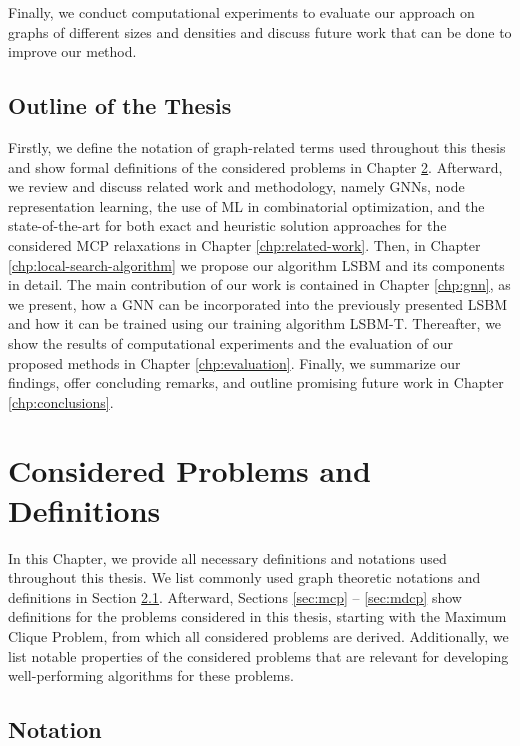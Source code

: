 \documentclass[draft,final]{vutinfth} %
\begin{document}
Finally, we conduct computational experiments to evaluate our approach on graphs of different sizes and densities and discuss future work that can be done to improve our method. 

\section{Outline of the Thesis}\label{sec:outline}
Firstly, we define the notation of graph-related terms used throughout this thesis and show formal definitions of the considered problems in Chapter \ref{chp:problems-definitions}. 
Afterward, we review and discuss related work and methodology, namely GNNs, node representation learning, the use of ML in combinatorial optimization, and the state-of-the-art for both exact and heuristic solution approaches for the considered MCP relaxations in Chapter \ref{chp:related-work}. 
Then, in Chapter \ref{chp:local-search-algorithm} we propose our algorithm LSBM and its components in detail. The main contribution of our work is contained in Chapter \ref{chp:gnn}, as we present, how a GNN can be incorporated into the previously presented LSBM and how it can be trained using our training algorithm LSBM-T. Thereafter, we show the results of computational experiments and the evaluation of our proposed methods in Chapter \ref{chp:evaluation}. Finally, we summarize our findings, offer concluding remarks, and outline promising future work in Chapter \ref{chp:conclusions}. 

\chapter{Considered Problems and Definitions}\label{chp:problems-definitions}

In this Chapter, we provide all necessary definitions and notations used throughout this thesis. We list commonly used graph theoretic notations and definitions in Section \ref{sec:notation}. Afterward, Sections \ref{sec:mcp} -- \ref{sec:mdcp} show definitions for the problems considered in this thesis, starting with the Maximum Clique Problem, from which all considered problems are derived. Additionally, we list notable properties of the considered problems that are relevant for developing well-performing algorithms for these problems. 

\section{Notation}\label{sec:notation}
\end{document}
